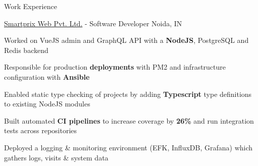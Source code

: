 \documentclass[../resume.tex]{subfiles}
\begin{document}
\begin{rSection}{Work Experience}
\begin{rSubsection}
\begin{rSubsection}
\end{rSubsection}

\begin{rSubsection}
    {\href{https://go.rohit.page/smpx}{Smartprix Web Pvt. Ltd.}}
    {  -  }
    {Software Developer}
    {Noida, IN}

    \item Worked on VueJS admin and GraphQL API with a \textbf{NodeJS}, PostgreSQL and Redis backend
    \item Responsible for production \textbf{deployments} with PM2 and infrastructure configuration with \textbf{Ansible}
    \item Enabled static type checking of projects by adding \textbf{Typescript} type definitions to existing NodeJS modules
    \item Built automated \textbf{CI pipelines} to increase coverage by \textbf{26\%} and run integration tests across repositories
    \item Deployed a logging \& monitoring environment (EFK, InfluxDB, Grafana) which gathers logs, visits \& system data

\end{rSubsection}


\end{rSubsection}
\end{rSection}
\end{document}
